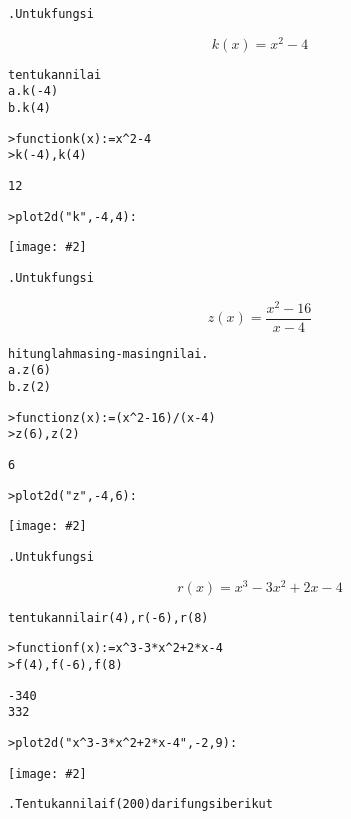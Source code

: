 \documentclass[a4paper,10pt]{article}
\newenvironment{eulernotebook}{}{}
\newenvironment{eulercomment}
{\color{green}\vspace{5pt}%
\parskip=0pt\parsep=0pt\topsep=0pt%
\goodbreak\begin{alltt}\ignorespaces}
{\end{alltt}\vspace{5pt}}
\newenvironment{eulerprompt}
{\color{red}\vspace{5pt plus 20pt}%
\begin{shaded}\parskip=0pt\parsep=0pt\topsep=0pt%
\begin{alltt}\ignorespaces}
{\end{alltt}\end{shaded}\vspace{5pt}}
\newenvironment{euleroutput}
{\color{black}\vspace{5pt}%
\parskip=0pt\parsep=0pt\topsep=0pt%
\begin{alltt}\ignorespaces}
{\end{alltt}\vspace{5pt}}
\newlength{\eulerline}
\newcommand\eulerimg[2]{%
\begin{center}\texttt{[image: \#2]}\end{center}}
\newenvironment{eulerformula}
{\color{green}\belowdisplayskip=0pt\belowdisplayshortskip=0pt%
\abovedisplayskip=0pt\abovedisplayshortskip=0pt}{}
\begin{document}
\begin{eulernotebook}
\begin{eulercomment}
1. Untuk fungsi
\end{eulercomment}
\begin{eulerformula}
\[
k(x) = x^2-4
\]
\end{eulerformula}
\begin{eulercomment}
tentukan nilai
a. k(-4)
b. k(4)
\end{eulercomment}
\begin{eulerprompt}
>function k(x) := x^2 -4
>k(-4), k(4)
\end{eulerprompt}
\begin{euleroutput}
  12
  12
\end{euleroutput}
\begin{eulerprompt}
>plot2d("k",-4,4):
\end{eulerprompt}
\eulerimg{17}{images/Ardan Andhirta_22305141045_EMT4Kalkulus-1-002.png}
\begin{eulercomment}
2. Untuk fungsi
\end{eulercomment}
\begin{eulerformula}
\[
z(x) = \frac{x^2-16}{x-4}
\]
\end{eulerformula}
\begin{eulercomment}
hitunglah masing-masing nilai.
a. z(6)
b. z(2)
\end{eulercomment}
\begin{eulerprompt}
>function z(x) := (x^2-16)/(x-4)
>z(6), z(2)
\end{eulerprompt}
\begin{euleroutput}
  10
  6
\end{euleroutput}
\begin{eulerprompt}
>plot2d("z",-4,6):
\end{eulerprompt}
\eulerimg{17}{images/Ardan Andhirta_22305141045_EMT4Kalkulus-1-003.png}
\begin{eulercomment}
3. Untuk fungsi
\end{eulercomment}
\begin{eulerformula}
\[
r(x) = x^3 - 3x^2 + 2x - 4
\]
\end{eulerformula}
\begin{eulercomment}
tentukan nilai r(4), r(-6), r(8)
\end{eulercomment}
\begin{eulerprompt}
>function f(x) := x^3-3*x^2+2*x-4
>f(4), f(-6), f(8)
\end{eulerprompt}
\begin{euleroutput}
  20
  -340
  332
\end{euleroutput}
\begin{eulerprompt}
>plot2d("x^3-3*x^2+2*x-4",-2,9):
\end{eulerprompt}
\eulerimg{17}{images/Ardan Andhirta_22305141045_EMT4Kalkulus-1-004.png}
\begin{eulercomment}
4. Tentukan nilai f(200) dari fungsi berikut


\end{eulercomment}
\end{eulernotebook}
\end{document}
